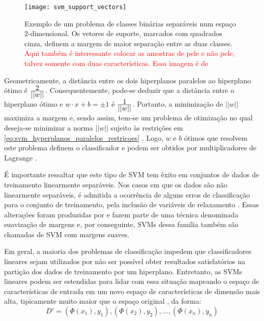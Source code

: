 \begin{figure}[!h]
  \centering
  \texttt{[image: svm\_support\_vectors]}
  \caption[Exemplo de um problema de classes binárias separáveis num espaço $2$-dimensional]{Exemplo de um problema de classes binárias separáveis num espaço $2$-dimensional. Os vetores de suporte, marcados com quadrados cinza, definem a margem de maior separação entre as duas classes. \textcolor{red}{Aqui também é interessante colocar as amostras de pele e não pele, talvez somente com duas características. Essa imagem é de \citep{cortes:95}}}
  \label{fig:svm_support_vectors}
\end{figure}

Geometricamente, a distância entre os dois hiperplanos paralelos ao hiperplano ótimo é $\frac{\displaystyle 2}{\displaystyle ||w||}$. Consequentemente, pode-se deduzir que a distância entre o hiperplano ótimo e $w \cdot x + b = \pm 1$ é $\frac{\displaystyle 1}{\displaystyle ||w||}$. Portanto, a minimização de $||w||$ maximiza a margem e, sendo assim, tem-se um problema de otimização no qual deseja-se minimizar a norma $||w||$ sujeito às restrições em \ref{eq:svm_hyperplanos_paralelos_restricoes} \citep{lorena:03}. Logo, $w$ e $b$ ótimos que resolvem este problema definem o classificador e podem ser obtidos por multiplicadores de Lagrange \citep{campbell:00}.

É importante ressaltar que este tipo de SVM tem êxito em conjuntos de dados de treinamento linearmente separáveis. Nos casos em que os dados são não linearmente separáveis, é admitida a ocorrência de alguns erros de classificação para o conjunto de treinamento, pela inclusão de variáveis de relaxamento \citep{lorena:03}. Essas alterações foram produzidas por \citet{cortes:95} e fazem parte de uma técnica denominada suavização de margens e, por conseguinte, SVMs dessa família também são chamadas de SVM com margens suaves.

Em geral, a maioria dos problemas de classificação impedem que classificadores lineares sejam utilizados por não ser possível obter resultados satisfatórios na partição dos dados de treinamento por um hiperplano. Entretanto, as SVMs lineares podem ser estendidas para lidar com essa situação mapeando o espaço de características de entrada em um novo espaço de características de dimensão mais alta, tipicamente muito maior que o espaço original \citep{duda:12}, da forma:
\begin{equation}
\label{eq:svm_dataset_transformado}
    D' = (\Phi(x_1), y_1), (\Phi(x_2), y_2), \ldots, (\Phi(x_n), y_n)
\end{equation}

